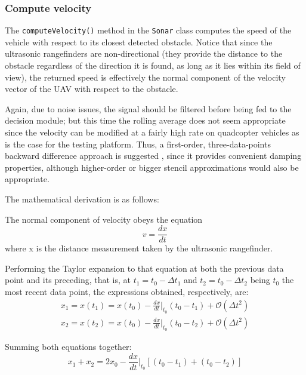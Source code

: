 \subsubsection{Compute velocity} \label{sec:velocity}

The \texttt{computeVelocity()} method in the \texttt{Sonar} class computes the speed of the vehicle with respect to its closest detected obstacle.
Notice that since the ultrasonic rangefinders are non-directional (they provide the distance to the obstacle regardless of the direction it is found, as long as it lies within its field of view), the returned speed is effectively the normal component of the velocity vector of the UAV with respect to the obstacle.

Again, due to noise issues, the signal should be filtered before being fed to the decision module; but this time the rolling average does not seem appropriate since the velocity can be modified at a fairly high rate on quadcopter vehicles as is the case for the testing platform.
Thus, a first-order, three-data-points backward difference approach is suggested \cite{asselin1972}, since it provides convenient damping properties, although higher-order or bigger stencil approximations would also be appropriate.

The mathematical derivation is as follows:

The normal component of velocity obeys the equation
\begin{equation}
	v=\frac{d x}{d t}
	\label{eq:v}
\end{equation}
where x is the distance measurement taken by the ultrasonic rangefinder.

Performing the Taylor expansion to that equation at both the previous data point and its preceding, that is, at $t_1=t_0-\Delta t_1$ and $t_2=t_0-\Delta t_2$ being $t_0$ the most recent data point, the expressions obtained, respectively, are:
\begin{eqnarray}
	x_1=x\left(t_1\right)=x\left(t_0\right) 
		- \frac{dx}{dt} \Bigg\rvert_{t_0} \left(t_0-t_1\right) 
		+ \mathcal{O}\left(\Delta t^2\right)	\\
	x_2=x\left(t_2\right)=x\left(t_0\right)
		- \frac{dx}{dt} \Bigg\rvert_{t_0} \left(t_0-t_2\right) 
		+ \mathcal{O}\left(\Delta t^2\right)
	\label{eq:taylor}
\end{eqnarray}

Summing both equations together:
\begin{equation}
	x_1+x_2=2x_0-\frac{dx}{dt}\Bigg\rvert_{t_0}
		\left[\left(t_0-t_1\right)+\left(t_0-t_2\right)\right]
	\label{eq:finite}
\end{equation}

